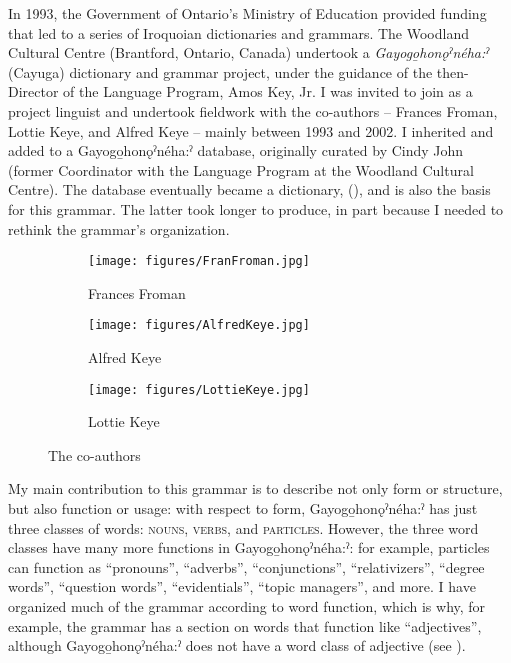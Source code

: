 
In 1993, the Government of Ontario’s Ministry of Education provided funding that led to a series of Iroquoian dictionaries and grammars. The Woodland Cultural Centre (Brantford, Ontario, Canada) undertook a \textit{Gayogo̱honǫˀnéha:ˀ} (Cayuga) dictionary and grammar project, under the guidance of the then-Director of the Language Program, Amos Key, Jr. I was invited to join as a project linguist and undertook fieldwork with the co-authors – Frances Froman, Lottie Keye, and Alfred Keye – mainly between 1993 and 2002. I inherited and added to a Gayogo̱honǫˀnéha:ˀ database, originally curated by Cindy John (former Coordinator with the Language Program at the Woodland Cultural Centre). The database eventually became a dictionary, (\citep{froman_english-cayugacayuga-english_2002}), and is also the basis for this grammar. The latter took longer to produce, in part because I needed to rethink the grammar’s organization. 

\begin{figure}
\begin{subfigure}{0.3\textwidth}
\texttt{[image: figures/FranFroman.jpg]}
\caption{Frances Froman}
\end{subfigure}\hfill
\begin{subfigure}{0.3\textwidth}
\centering
\texttt{[image: figures/AlfredKeye.jpg]}
\caption{Alfred Keye}
\end{subfigure}\hfill
\begin{subfigure}{0.3\textwidth}
\texttt{[image: figures/LottieKeye.jpg]}
\caption{Lottie Keye}
\end{subfigure}
\caption{The co-authors}
\end{figure}



My main contribution to this grammar is to describe not only form or structure, but also function or usage: with respect to form, Gayogo̱honǫˀnéha:ˀ has just three classes of words: \textsc{nouns}, \textsc{verbs}, and \textsc{particles}. However, the three word classes have many more functions in Gayogo̱honǫˀnéha:ˀ: for example, particles can function as “pronouns”, “adverbs”, “conjunctions”, “relativizers”, “degree words”, “question words”, “evidentials”, “topic managers”, and more. I have organized much of the grammar according to word function, which is why, for example, the grammar has a section on words that function like “adjectives”, although Gayogo̱honǫˀnéha:ˀ does not have a word class of adjective (see ).

